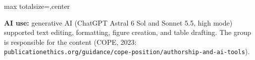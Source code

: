 \documentclass[12pt]{article}
\begin{document}
\begin{adjustbox}{max totalsize={\textwidth}{\textheight},center}
{\vspace{2mm}

\vspace{2mm}
{\fontsize{10.5}{13}\selectfont\color{ctxText}\textbf{AI use:} generative AI (ChatGPT Astral 6 Sol and Sonnet 5.5, high mode) supported text editing, formatting, figure creation, and table drafting. The group is responsible for the content (COPE, 2023: \texttt{publicationethics.org/guidance/cope-position/authorship-and-ai-tools}).\par}

}%
\end{adjustbox}
\end{document}
